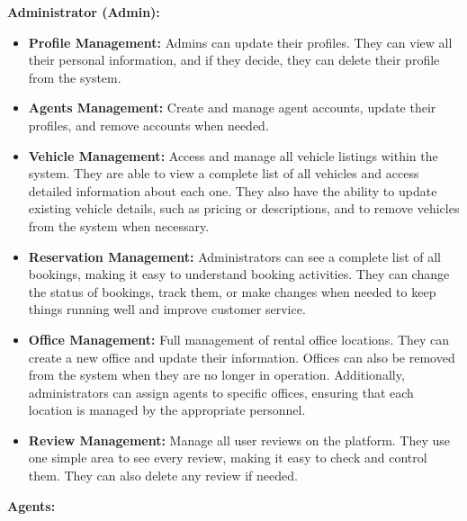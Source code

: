 \noindent\textbf{Administrator (Admin):}
\begin{itemize}
 \item \textbf{Profile Management:} Admins can update their profiles. They can view all their personal information, and if they decide, they can delete their profile from the system.
    \item \textbf{Agents Management:} Create and manage agent accounts, update their profiles, and remove accounts when needed.
    \item \textbf{Vehicle Management:} Access and manage all vehicle listings within the system. They are able to view a complete list of all vehicles and access detailed information about each one. They also have the ability to update existing vehicle details, such as pricing or descriptions, and to remove vehicles from the system when necessary.
    \item \textbf{Reservation Management:} Administrators can see a complete list of all bookings, making it easy to understand booking activities. They can change the status of bookings, track them, or make changes when needed to keep things running well and improve customer service.
    
    \item \textbf{Office Management:} Full management of rental office locations. They can create a new office and update their information. Offices can also be removed from the system when they are no longer in operation. Additionally, administrators can assign agents to specific offices, ensuring that each location is managed by the appropriate personnel.
    
    \item \textbf{Review Management:} Manage all user reviews on the platform. They use one simple area to see every review, making it easy to check and control them. They can also delete any review if needed.
\end{itemize}
\noindent\textbf{Agents:}
